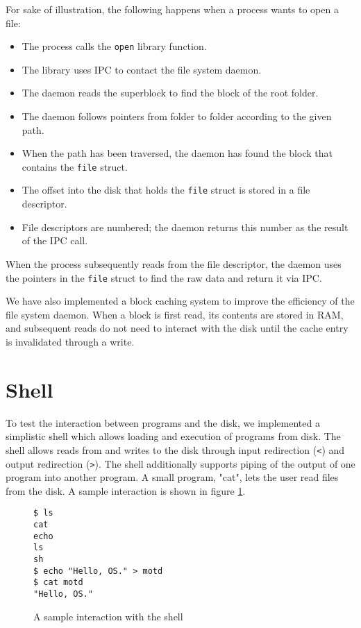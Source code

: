 \documentclass{report}
\begin{document}
For sake of illustration, the following happens when a process wants to open a
file:
\begin{itemize}
\item The process calls the \texttt{open} library function.
\item The library uses IPC to contact the file system daemon.
\item The daemon reads the superblock to find the block of the root folder.
\item The daemon follows pointers from folder to folder according to the given
path.
\item When the path has been traversed, the daemon has found the block that
contains the \texttt{file} struct.
\item The offset into the disk that holds the \texttt{file} struct is stored
in a file descriptor.
\item File descriptors are numbered; the daemon returns this number as the
result of the IPC call.
\end{itemize}
When the process subsequently reads from the file descriptor, the daemon
uses the pointers in the \texttt{file} struct to find the raw data and return
it via IPC.

We have also implemented a block caching system to improve the efficiency of
the file system daemon. When a block is first read, its contents are stored in
RAM, and subsequent reads do not need to interact with the disk until the
cache entry is invalidated through a write.


\section{Shell}
To test the interaction between programs and the disk, we implemented a
simplistic shell which allows loading and execution of programs from disk. The
shell allows reads from and writes to the disk through input redirection
(\texttt{<}) and output redirection (\texttt{>}). The shell additionally
supports piping of the output of one program into another program. A small
program, "cat", lets the user read files from the disk. A sample interaction
is shown in figure \ref{fig:shellinteraction}.

\begin{figure}[h]
\begin{framed}
\begin{Verbatim}[fontsize=\small]
$ ls
cat
echo
ls
sh
$ echo "Hello, OS." > motd
$ cat motd
"Hello, OS." 
\end{Verbatim}
\end{framed}
\caption{A sample interaction with the shell}
\label{fig:shellinteraction}
\end{figure}
\end{document}
